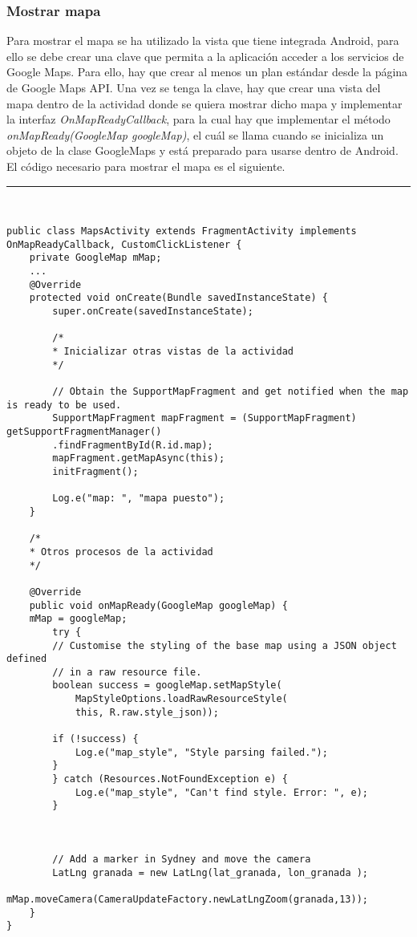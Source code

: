 \subsubsection{Mostrar mapa}
Para mostrar el mapa se ha utilizado la vista que tiene integrada Android, para ello se debe crear una clave que  permita a la aplicación acceder a los servicios de Google Maps. Para ello, hay que crear al menos un plan estándar desde la página de Google Maps API. Una vez se tenga la clave, hay que crear una vista del mapa dentro de la actividad donde se quiera mostrar dicho mapa y implementar la interfaz \textit{OnMapReadyCallback}, para la cual hay que implementar el método \textit{onMapReady(GoogleMap googleMap)}, el cuál se llama cuando se inicializa un objeto de la clase GoogleMaps y está preparado para usarse dentro de Android. El código necesario para mostrar el mapa es el siguiente.
\newpage
\noindent\rule[-1ex]{\textwidth}{1pt}\\
\begin{lstlisting}[caption=código necesario para mostrar el mapa en la aplicación.]
public class MapsActivity extends FragmentActivity implements OnMapReadyCallback, CustomClickListener {
	private GoogleMap mMap;
	...
	@Override
	protected void onCreate(Bundle savedInstanceState) {
		super.onCreate(savedInstanceState);
		
		/*
		* Inicializar otras vistas de la actividad
		*/
		
		// Obtain the SupportMapFragment and get notified when the map is ready to be used.
		SupportMapFragment mapFragment = (SupportMapFragment) getSupportFragmentManager()
		.findFragmentById(R.id.map);
		mapFragment.getMapAsync(this);
		initFragment();
		
		Log.e("map: ", "mapa puesto");
	}
	
	/*
	* Otros procesos de la actividad
	*/
	
	@Override
	public void onMapReady(GoogleMap googleMap) {
	mMap = googleMap;
		try {
		// Customise the styling of the base map using a JSON object defined
		// in a raw resource file.
		boolean success = googleMap.setMapStyle(
			MapStyleOptions.loadRawResourceStyle(
			this, R.raw.style_json));
		
		if (!success) {
			Log.e("map_style", "Style parsing failed.");
		}
		} catch (Resources.NotFoundException e) {
			Log.e("map_style", "Can't find style. Error: ", e);
		}
		
		
		
		// Add a marker in Sydney and move the camera
		LatLng granada = new LatLng(lat_granada, lon_granada );
		mMap.moveCamera(CameraUpdateFactory.newLatLngZoom(granada,13));
	}
}
\end{lstlisting}
